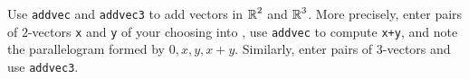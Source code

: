 \documentclass{ximera}
\begin{document}
\begin{computerExercise} \label{c1.4.4}
Use {\tt addvec} and {\tt addvec3} to add vectors in $\mbox{$\Bbb{R}$}^2$ and
$\mbox{$\Bbb{R}$}^3$.  More precisely, enter pairs of $2$-vectors {\tt x} and {\tt y} 
of your choosing into \Matlabp, use {\tt addvec} to compute {\tt x+y},
and note the parallelogram formed by $0,x,y,x+y$.  Similarly, enter 
pairs of $3$-vectors and use {\tt addvec3}.

\begin{solution}

\end{solution}
\end{computerExercise}
\end{document}
